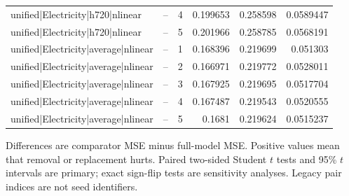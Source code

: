 \begin{longtable}{llrrrr}
unified|Electricity|h720|nlinear & -- & 4 & 0.199653 & 0.258598 & 0.0589447 \\
unified|Electricity|h720|nlinear & -- & 5 & 0.201966 & 0.258785 & 0.0568191 \\
unified|Electricity|average|nlinear & -- & 1 & 0.168396 & 0.219699 & 0.051303 \\
unified|Electricity|average|nlinear & -- & 2 & 0.166971 & 0.219772 & 0.0528011 \\
unified|Electricity|average|nlinear & -- & 3 & 0.167925 & 0.219695 & 0.0517704 \\
unified|Electricity|average|nlinear & -- & 4 & 0.167487 & 0.219543 & 0.0520555 \\
unified|Electricity|average|nlinear & -- & 5 & 0.1681 & 0.219624 & 0.0515237 \\
\bottomrule
\end{longtable}

Differences are comparator MSE minus full-model MSE. Positive values mean that removal or replacement hurts. Paired two-sided Student $t$ tests and 95\% $t$ intervals are primary; exact sign-flip tests are sensitivity analyses. Legacy pair indices are not seed identifiers.

